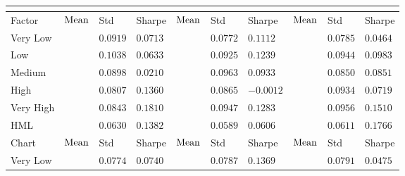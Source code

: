 \renewcommand{\maxnum}{0.0172}
\begin{tabularx}{\linewidth}{*{10}{X}}
\toprule
& & & \\
\midrule
Factor & $\textnormal{Mean}$ & \textnormal{Std} & \textnormal{Sharpe} & $\textnormal{Mean}$ & \textnormal{Std} & \textnormal{Sharpe} & $\textnormal{Mean}$ & \textnormal{Std} & \textnormal{Sharpe}\\
\midrule
Very Low &  & $0.0919$ & $0.0713$ &  & $0.0772$ & $0.1112$ &  & $0.0785$ & $0.0464$\\
Low &  & $0.1038$ & $0.0633$ &  & $0.0925$ & $0.1239$ &  & $0.0944$ & $0.0983$\\
Medium &  & $0.0898$ & $0.0210$ &  & $0.0963$ & $0.0933$ &  & $0.0850$ & $0.0851$\\
High &  & $0.0807$ & $0.1360$ &  & $0.0865$ & $-0.0012$ &  & $0.0934$ & $0.0719$\\
Very High &  & $0.0843$ & $0.1810$ &  & $0.0947$ & $0.1283$ &  & $0.0956$ & $0.1510$\\
HML &  & $0.0630$ & $0.1382$ &  & $0.0589$ & $0.0606$ &  & $0.0611$ & $0.1766$\\
\midrule
Chart & $\textnormal{Mean}$ & \textnormal{Std} & \textnormal{Sharpe} & $\textnormal{Mean}$ & \textnormal{Std} & \textnormal{Sharpe} & $\textnormal{Mean}$ & \textnormal{Std} & \textnormal{Sharpe}\\
\midrule
Very Low &  & $0.0774$ & $0.0740$ &  & $0.0787$ & $0.1369$ &  & $0.0791$ & $0.0475$\\

\end{tabularx}
